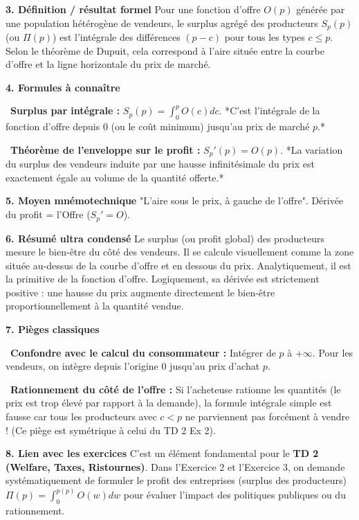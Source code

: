 \documentclass[11pt, a4paper]{report}
\begin{document}
\textbf{3. Définition / résultat formel}
Pour une fonction d'offre $O(p)$ générée par une population hétérogène de vendeurs, le surplus agrégé des producteurs $S_p(p)$ (ou $\Pi(p)$) est l'intégrale des différences $(p-c)$ pour tous les types $c \le p$.
Selon le théorème de Dupuit, cela correspond à l'aire située entre la courbe d'offre et la ligne horizontale du prix de marché.

\textbf{4. Formules à connaître}
\par \textbullet\ \textbf{Surplus par intégrale :} $S_p(p) = \int_0^p O(c) dc$. *C'est l'intégrale de la fonction d'offre depuis 0 (ou le coût minimum) jusqu'au prix de marché $p$.*
\par \textbullet\ \textbf{Théorème de l'enveloppe sur le profit :} $S_p'(p) = O(p)$. *La variation du surplus des vendeurs induite par une hausse infinitésimale du prix est exactement égale au volume de la quantité offerte.*

\textbf{5. Moyen mnémotechnique}
"L'aire sous le prix, à gauche de l'offre". Dérivée du profit = l'Offre ($S_p' = O$).

\textbf{6. Résumé ultra condensé}
Le surplus (ou profit global) des producteurs mesure le bien-être du côté des vendeurs. Il se calcule visuellement comme la zone située au-dessus de la courbe d'offre et en dessous du prix. Analytiquement, il est la primitive de la fonction d'offre. Logiquement, sa dérivée est strictement positive : une hausse du prix augmente directement le bien-être proportionnellement à la quantité vendue.

\textbf{7. Pièges classiques}
\par \textbullet\ \textbf{Confondre avec le calcul du consommateur :} Intégrer de $p$ à $+\infty$. Pour les vendeurs, on intègre depuis l'origine $0$ jusqu'au prix d'achat $p$.
\par \textbullet\ \textbf{Rationnement du côté de l'offre :} Si l'acheteuse rationne les quantités (le prix est trop élevé par rapport à la demande), la formule intégrale simple est fausse car tous les producteurs avec $c < p$ ne parviennent pas forcément à vendre ! (Ce piège est symétrique à celui du TD 2 Ex 2).

\textbf{8. Lien avec les exercices}
C'est un élément fondamental pour le \textbf{TD 2 (Welfare, Taxes, Ristournes)}. Dans l'Exercice 2 et l'Exercice 3, on demande systématiquement de formuler le profit des entreprises (surplus des producteurs) $\Pi(p) = \int_0^{p(p)} O(w)dw$ pour évaluer l'impact des politiques publiques ou du rationnement.
\end{document}
